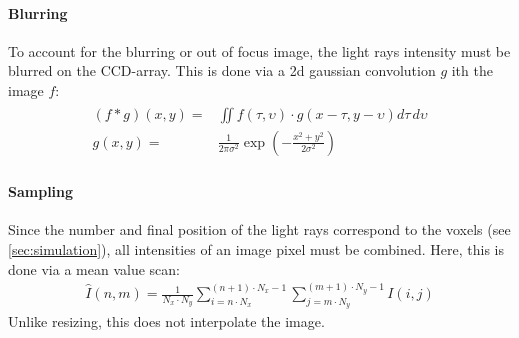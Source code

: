 \paragraph{Blurring}
To account for the blurring or out of focus image, the light rays intensity must be blurred on the \ac{CCD}-array.
This is done via a 2d gaussian convolution $g$ ith the image $f$:
\begin{align}
\begin{split}
    (f * g)(x,y) =& \iint f(\tau,\upsilon) \cdot g(x-\tau, y-\upsilon)d\tau \, d\upsilon\\
    g(x,y) =& \frac{1}{2\pi\sigma^2} \exp(-\frac{x^2+y^2}{2\sigma^2})
\end{split}
\end{align}
%
\paragraph{Sampling}
Since the number and final position of the light rays correspond to the voxels (see \cref{sec:simulation}), all intensities of an image pixel must be combined.
Here, this is done via a mean value scan:
\begin{align}
    \hat{I}(n,m) =\frac{1}{N_x \cdot N_y} \sum_{i=n \cdot N_x}^{(n+1) \cdot N_x-1}\sum_{j=m \cdot N_y}^{(m+1) \cdot N_y-1} I(i,j)
\end{align}
Unlike resizing, this does not interpolate the image.
%
